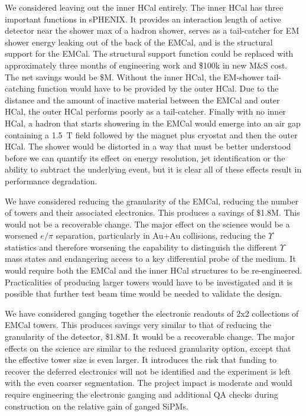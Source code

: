 We considered leaving out the inner HCal entirely.  The inner HCal has
three important functions in sPHENIX.  It provides an interaction
length of active detector near the shower max of a hadron shower,
serves as a tail-catcher for EM shower energy leaking out of the back
of the EMCal, and is the structural support for the EMCal.  The
structural support function could be replaced with approximately three
months of engineering work and \$100k in new M\&S cost.  The net
savings would be \${\noInnerHCal}M.  Without the inner HCal, the
EM-shower tail-catching function would have to be provided by the
outer HCal.  Due to the distance and the amount of inactive material
between the EMCal and outer HCal, the outer HCal performs poorly as a
tail-catcher.  Finally with no inner HCal, a hadron that starts
showering in the EMCal would emerge into an air gap containing a 1.5~T
field followed by the magnet plus cryostat and then the outer HCal.
The shower would be distorted in a way that must be better understood
before we can quantify its effect on energy resolution, jet
identification or the ability to subtract the underlying event, but it
is clear all of these effects result in performance degradation.

We have considered reducing the granularity of the EMCal, reducing the
number of towers and their associated electronics.  This produces a
savings of \$1.8M.  This would not be a recoverable change.  The major
effect on the science would be a worsened $e/\pi$ separation,
particularly in Au+Au collisions, reducing the $\Upsilon$ statistics
and therefore worsening the capability to distinguish the different
$\Upsilon$ mass states and endangering access to a key differential
probe of the medium.  It would require both the EMCal and the inner
HCal structures to be re-engineered.  Practicalities of producing
larger towers would have to be investigated and it is possible that
further test beam time would be needed to validate the design.

We have considered ganging together the electronic readouts of 2x2
collections of EMCal towers. This produces savings very similar to
that of reducing the granularity of the detector, \$1.8M.  It would be
a recoverable change.  The major effects on the science are similar to
the reduced granularity option, except that the effective tower size
is even larger.  It introduces the risk that funding to recover the
deferred electronics will not be identified and the experiment is left
with the even coarser segmentation.  The project impact is moderate
and would require engineering the electronic ganging and additional QA
checks during construction on the relative gain of ganged SiPMs.

